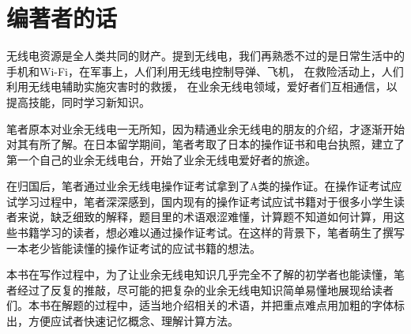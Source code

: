 \chapter*{编著者的话}

无线电资源是全人类共同的财产。提到无线电，我们再熟悉不过的是日常生活中的手机和Wi-Fi，在军事上，人们利用无线电控制导弹、飞机，%
在救险活动上，人们利用无线电辅助实施灾害时的救援，%
在业余无线电领域，爱好者们互相通信，以提高技能，同时学习新知识。

笔者原本对业余无线电一无所知，因为精通业余无线电的朋友的介绍，才逐渐开始对其有所了解。在日本留学期间，笔者考取了日本的操作证书和电台执照，建立了第一个自己的业余无线电台，开始了业余无线电爱好者的旅途。

在归国后，笔者通过业余无线电操作证考试拿到了A类的操作证。在操作证考试应试学习过程中，笔者深深感到，国内现有的操作证考试应试书籍对于很多小学生读者来说，缺乏细致的解释，题目里的术语艰涩难懂，计算题不知道如何计算，用这些书籍学习的读者，想必难以通过操作证考试。在这样的背景下，笔者萌生了撰写一本老少皆能读懂的操作证考试的应试书籍的想法。

本书在写作过程中，为了让业余无线电知识几乎完全不了解的初学者也能读懂，笔者经过了反复的推敲，尽可能的把复杂的业余无线电知识简单易懂地展现给读者们。本书在解题的过程中，适当地介绍相关的术语，并把重点难点用加粗的字体标出，方便应试者快速记忆概念、理解计算方法。


